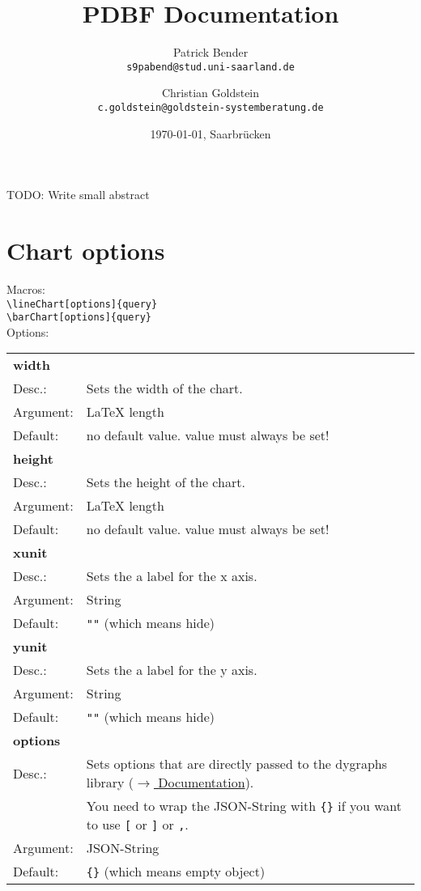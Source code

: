 \documentclass[11pt]{scrartcl}
\title{PDBF Documentation}
\author{
 Patrick Bender\\
  \texttt{s9pabend@stud.uni-saarland.de}
  \and
 Christian Goldstein\\
  \texttt{c.goldstein@goldstein-systemberatung.de}
}
\date{\today{}, Saarbrücken}
\begin{document}
\maketitle

TODO: Write small abstract \newpage

\section{Chart options}
Macros: \\[3pt]
\verb|\lineChart[options]{query}| \\
\verb|\barChart[options]{query}| \\[8pt]
\noindent Options: \\[3pt]
\begin{tabular}{ll}
\textbf{width} & \\
Desc.:	&	Sets the width of the chart. \\
Argument:	&LaTeX length \\
Default:&	no default value. value must always be set! \\[4pt]

\textbf{height} \\
Desc.:	&	Sets the height of the chart. \\
Argument: &	LaTeX length \\
Default:&	no default value. value must always be set! \\[4pt]

\textbf{xunit} \\
Desc.:	&	Sets the a label for the x axis. \\
Argument: &	String \\
Default:& 	\verb|""| (which means hide) \\[4pt]

\textbf{yunit} \\
Desc.:	&	Sets the a label for the y axis. \\
Argument: 	&String \\
Default:& 	\verb|""| (which means hide) \\[4pt]

\textbf{options} \\
Desc.:	&	Sets options that are directly passed to the dygraphs library (\href{http://dygraphs.com/options.html}{$\rightarrow$ Documentation}). \\
& You need to wrap the JSON-String with \verb|{}| if you want to use \verb|[| or \verb|]| or \verb|,|. \\
Argument: 	&JSON-String \\
Default:&	\verb|{}| (which means empty object) \\[4pt]


\end{tabular}
\end{document}

